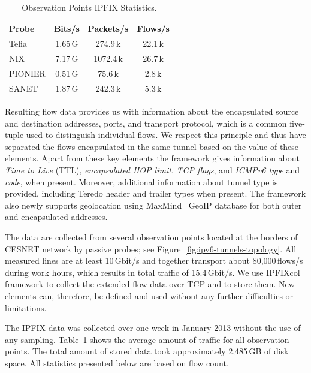 \begin{table}[!tb]
\centering
        \begin{tabular}{lccc}
        \textbf{Probe} & \textbf{Bits/s} & \textbf{Packets/s} & \textbf{Flows/s} \\ \toprule 
        Telia & 1.65\,G & 274.9\,k & 22.1\,k \\
        NIX & 7.17\,G & 1072.4\,k & 26.7\,k \\
        PIONIER & 0.51\,G & 75.6\,k & 2.8\,k \\
        SANET & 1.87\,G & 242.3\,k & 5.3\,k \\ \bottomrule
        \end{tabular}
        \caption{Observation Points IPFIX Statistics.}
        \label{tab:ipv6-tunnels-collected-data}
\end{table}

Resulting flow data provides us with information about the encapsulated source and destination addresses, ports, and transport protocol, which is a common five-tuple used to distinguish individual flows. We respect this principle and thus have separated the flows encapsulated in the same tunnel based on the value of these elements. Apart from these key elements the framework gives information about \emph{Time to Live} (TTL), \emph{encapsulated HOP limit}, \emph{TCP flags}, and \emph{ICMPv6 type} and \emph{code}, when present. Moreover, additional information about tunnel type is provided, including Teredo header and trailer types when present. The framework also newly supports geolocation using MaxMind~\cite{MaxMind-2013-MaxMind} GeoIP database for both outer and encapsulated addresses.

The data are collected from several observation points located at the borders of CESNET network by passive probes; see Figure~\ref{fig:ipv6-tunnels-topology}. All measured lines are at least 10\,Gbit/s and together transport about 80,000\,flows/s during work hours, which results in total traffic of 15.4\,Gbit/s. We use IPFIXcol~\cite{Velan-2012-Flow} framework to collect the extended flow data over TCP and to store them. New elements can, therefore, be defined and used without any further difficulties or limitations.

The IPFIX data was collected over one week in January 2013 without the use of any sampling. Table~\ref{tab:ipv6-tunnels-collected-data} shows the average amount of traffic for all observation points. The total amount of stored data took approximately 2,485\,GB of disk space. All statistics presented below are based on flow count.

